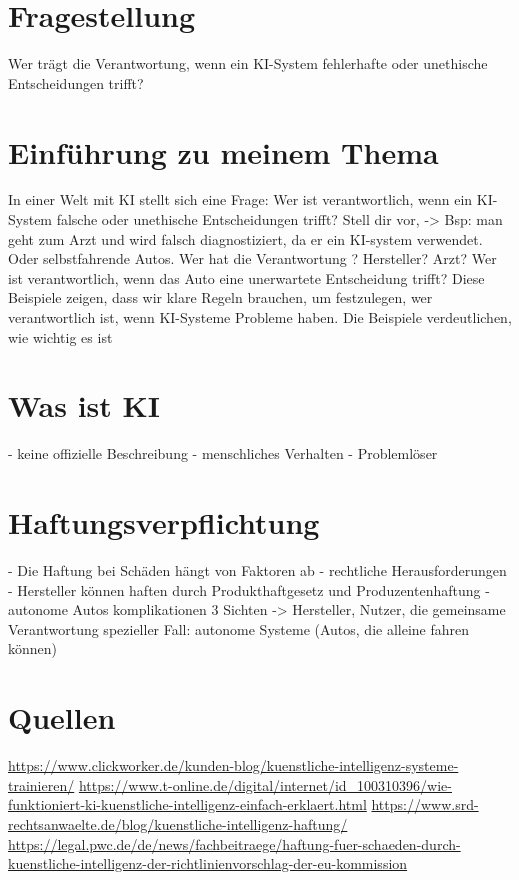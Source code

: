 \documentclass{article}
\begin{document}
\section {Fragestellung} 
    Wer trägt die Verantwortung, wenn ein KI-System fehlerhafte oder unethische Entscheidungen trifft?

\section {Einführung zu meinem Thema}
In einer Welt mit KI stellt sich eine Frage: Wer ist verantwortlich, 
wenn ein KI-System falsche oder unethische Entscheidungen trifft? 
Stell dir vor, -> Bsp: man geht zum Arzt und wird falsch diagnostiziert, da er ein KI-system verwendet.
 Oder selbstfahrende Autos.
 Wer hat die Verantwortung ? Hersteller? Arzt? 
 Wer ist verantwortlich, wenn das Auto eine unerwartete
 Entscheidung trifft? Diese Beispiele zeigen, dass wir klare Regeln brauchen, um festzulegen, wer verantwortlich ist, wenn KI-Systeme Probleme haben. 
 Die Beispiele verdeutlichen, wie wichtig es ist

\section {Was ist KI}
- keine offizielle Beschreibung
- menschliches Verhalten
- Problemlöser

\section {Haftungsverpflichtung}
- Die Haftung bei Schäden hängt von Faktoren ab
- rechtliche Herausforderungen
- Hersteller können haften durch Produkthaftgesetz und Produzentenhaftung
- autonome Autos komplikationen
3 Sichten -> Hersteller, Nutzer, die gemeinsame Verantwortung
spezieller Fall: autonome Systeme (Autos, die alleine fahren können)


 \section {Quellen}
 \url {https://www.clickworker.de/kunden-blog/kuenstliche-intelligenz-systeme-trainieren/}
 \url{https://www.t-online.de/digital/internet/id_100310396/wie-funktioniert-ki-kuenstliche-intelligenz-einfach-erklaert.html}
 \url {https://www.srd-rechtsanwaelte.de/blog/kuenstliche-intelligenz-haftung/}
 \url {https://legal.pwc.de/de/news/fachbeitraege/haftung-fuer-schaeden-durch-kuenstliche-intelligenz-der-richtlinienvorschlag-der-eu-kommission}
\end{document}
